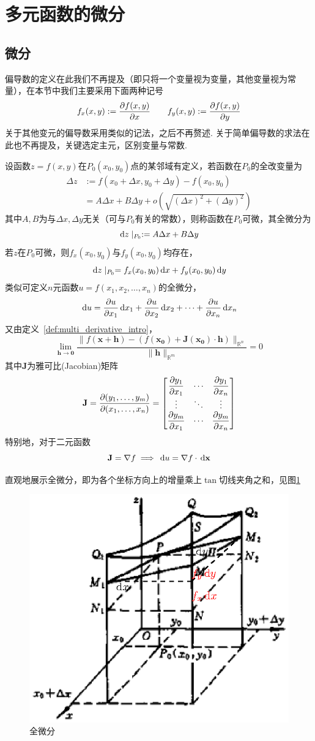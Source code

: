 
\section{多元函数的微分}
\subsection{微分}
偏导数的定义在此我们不再提及（即只将一个变量视为变量，其他变量视为常量），在本节中我们主要采用下面两种记号
\[f_x(x,y):=\dfrac{\partial f(x,y)}{\partial x}\qquad f_y(x,y):=\dfrac{\partial f(x,y)}{\partial y}\]
关于其他变元的偏导数采用类似的记法，之后不再赘述.
关于简单偏导数的求法在此也不再提及，关键选定主元，区别变量与常数.
\begin{definition}[全微分]
设函数$z=f(x,y)$在$P_0(x_0,y_0)$点的某邻域有定义，若函数在$P_0$的全改变量为
\[\begin{aligned}
\Delta z&:=f(x_0+\Delta x,y_0+\Delta y)-f(x_0,y_0)\\
&=A\Delta x+B\Delta y+o(\sqrt{(\Delta x)^2+(\Delta y)^2})
\end{aligned}\]
其中$A,B$为与$\Delta x,\Delta y$无关（可与$P_0$有关的常数），则称函数在$P_0$可微，其全微分为
\[\,\mathrm{d} z\mid_{P_0}:=A\Delta x+B\Delta y\]
若$z$在$P_0$可微，则$f_x(x_0,y_0)$与$f_y(x_0,y_0)$均存在，
\[\,\mathrm{d} z\mid_{P_0}=f_x(x_0,y_0)\,\mathrm{d} x+f_y(x_0,y_0)\,\mathrm{d} y\]
类似可定义$n$元函数$u=f(x_1,x_2,\ldots,x_n)$的全微分，
\[\,\mathrm{d} u=\dfrac{\partial u}{\partial x_1}\,\mathrm{d} x_1+\dfrac{\partial u}{\partial x_2}\,\mathrm{d} x_2+\cdots+\dfrac{\partial u}{\partial x_n}\,\mathrm{d} x_n\]
又由定义~\ref{def:multi_derivative_intro}，
\[\lim_{\mathbf{h}\to \mathbf{0}}\frac{\|f(\mathbf{x}+\mathbf{h})-(f(\mathbf{x_0})+\mathbf{J}(\mathbf{x_0})\cdot \mathbf{h})\|_{\mathbb{R}^n}}{\|\mathbf{h}\|_{\mathbb{R}^m}}=0\]
其中$\mathbf{J}$为雅可比(Jacobian)矩阵
\[\mathbf{J}=\frac{\partial (y_1,\ldots,y_m)}{\partial (x_1,\ldots,x_n)}=\begin{bmatrix}
\dfrac{\partial y_1}{\partial x_1} & \cdots & \dfrac{\partial y_1}{\partial x_n}\\
\vdots & \ddots & \vdots\\
\dfrac{\partial y_m}{\partial x_1} & \cdots & \dfrac{\partial y_m}{\partial x_n}
\end{bmatrix}\]
特别地，对于二元函数
\[\mathbf{J}=\nabla f\implies \,\mathrm{d} u=\nabla f\cdot\,\mathrm{d} \mathbf{x}\]
\end{definition}
直观地展示全微分，即为各个坐标方向上的增量乘上$\tan$切线夹角之和，见图\ref{fig:total_diff}
\begin{figure}[H]
\centering
\includegraphics[width=0.4\linewidth]{fig/total_diff.eps}
\caption{全微分}
\label{fig:total_diff}
\end{figure}
